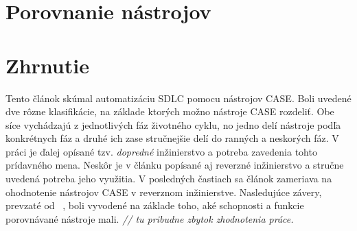 \documentclass[10pt,twoside,slovak,a4paper]{article}
\begin{document}
\pagebreak
\section{Porovnanie nástrojov}\label{porovnanie}
 
\section{Zhrnutie} \label{zhrnutie} 
Tento článok skúmal automatizáciu SDLC pomocu nástrojov CASE. Boli uvedené dve rôzne klasifikácie, na základe ktorých možno nástroje CASE rozdeliť. Obe síce vychádzajú z jednotlivých fáz životného cyklu, no jedno delí nástroje podľa konkrétnych fáz a druhé ich zase stručnejšie delí do ranných a neskorých fáz.
V práci je ďalej opísané tzv. \emph{dopredné} inžinierstvo a potreba zavedenia tohto prídavného mena. Neskôr je v článku popísané aj reverzné inžinierstvo a stručne uvedená potreba jeho využitia. 
V posledných častiach sa článok zameriava na ohodnotenie nástrojov CASE v reverznom inžinierstve. Nasledujúce závery, prevzaté od~ \cite{Osman:RE}, boli vyvodené na základe toho, aké schopnosti a funkcie porovnávané nástroje mali.
\emph{// tu pribudne zbytok zhodnotenia práce.}






\end{document}

